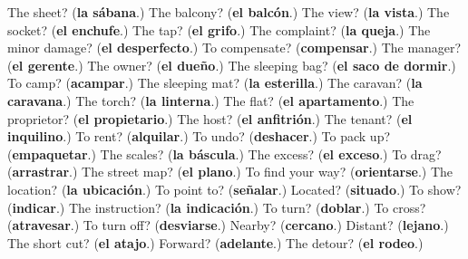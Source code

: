 \begin{tcolorbox}[breakable,colback=teal!4,colframe=teal!35!black,title={Before you move on}]
The sheet? (\textbf{la sábana}.) The balcony? (\textbf{el balcón}.) The view? (\textbf{la vista}.) The socket? (\textbf{el enchufe}.) The tap? (\textbf{el grifo}.) The complaint? (\textbf{la queja}.) The minor damage? (\textbf{el desperfecto}.) To compensate? (\textbf{compensar}.) The manager? (\textbf{el gerente}.) The owner? (\textbf{el dueño}.) The sleeping bag? (\textbf{el saco de dormir}.) To camp? (\textbf{acampar}.) The sleeping mat? (\textbf{la esterilla}.) The caravan? (\textbf{la caravana}.) The torch? (\textbf{la linterna}.) The flat? (\textbf{el apartamento}.) The proprietor? (\textbf{el propietario}.) The host? (\textbf{el anfitrión}.) The tenant? (\textbf{el inquilino}.) To rent? (\textbf{alquilar}.) To undo? (\textbf{deshacer}.) To pack up? (\textbf{empaquetar}.) The scales? (\textbf{la báscula}.) The excess? (\textbf{el exceso}.) To drag? (\textbf{arrastrar}.) The street map? (\textbf{el plano}.) To find your way? (\textbf{orientarse}.) The location? (\textbf{la ubicación}.) To point to? (\textbf{señalar}.) Located? (\textbf{situado}.) To show? (\textbf{indicar}.) The instruction? (\textbf{la indicación}.) To turn? (\textbf{doblar}.) To cross? (\textbf{atravesar}.) To turn off? (\textbf{desviarse}.) Nearby? (\textbf{cercano}.) Distant? (\textbf{lejano}.) The short cut? (\textbf{el atajo}.) Forward? (\textbf{adelante}.) The detour? (\textbf{el rodeo}.)
\end{tcolorbox}
